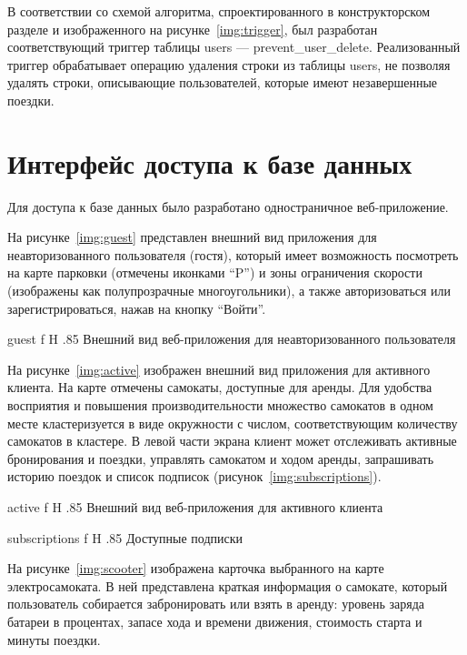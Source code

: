 В соответствии со схемой алгоритма, спроектированного в конструкторском разделе и изображенного на рисунке~\ref{img:trigger}, был разработан соответствующий триггер таблицы users --- prevent\_user\_delete. Реализованный триггер обрабатывает операцию удаления строки из таблицы users, не позволяя удалять строки, описывающие пользователей, которые имеют незавершенные поездки.

\vspace{.25cm}

\pagebreak
\section{Интерфейс доступа к базе данных}

Для доступа к базе данных было разработано одностраничное веб-приложение.

На рисунке~\ref{img:guest} представлен внешний вид приложения для неавторизованного пользователя (гостя), который имеет возможность посмотреть на карте парковки (отмечены иконками \enquote{P}) и зоны ограничения скорости (изображены как полупрозрачные многоугольники), а также авторизоваться или зарегистрироваться, нажав на кнопку \enquote{Войти}.

{guest}
{f}
{H}
{.85\textwidth}
{Внешний вид веб-приложения для неавторизованного пользователя}

На рисунке~\ref{img:active} изображен внешний вид приложения для активного клиента. На карте отмечены самокаты, доступные для аренды. Для удобства восприятия и повышения производительности множество самокатов в одном месте кластеризуется в виде окружности с числом, соответствующим количеству самокатов в кластере. В левой части экрана клиент может отслеживать активные бронирования и поездки, управлять самокатом и ходом аренды, запрашивать историю поездок и список подписок (рисунок~\ref{img:subscriptions}).

{active}
{f}
{H}
{.85\textwidth}
{Внешний вид веб-приложения для активного клиента}

{subscriptions}
{f}
{H}
{.85\textwidth}
{Доступные подписки}

На рисунке~\ref{img:scooter} изображена карточка выбранного на карте электросамоката. В ней представлена краткая информация о самокате, который пользователь собирается забронировать или взять в аренду: уровень заряда батареи в процентах, запасе хода и времени движения, стоимость старта и минуты поездки.

